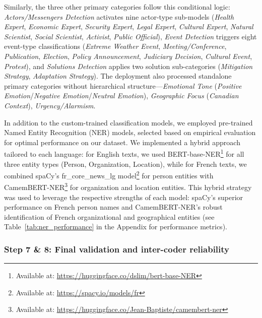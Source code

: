 Similarly, the three other primary categories follow this conditional logic: \emph{Actors/Messengers Detection} activates nine actor-type sub-models (\emph{Health Expert}, \emph{Economic Expert}, \emph{Security Expert}, \emph{Legal Expert}, \emph{Cultural Expert}, \emph{Natural Scientist}, \emph{Social Scientist}, \emph{Activist}, \emph{Public Official}), \emph{Event Detection} triggers eight event-type classifications (\emph{Extreme Weather Event}, \emph{Meeting/Conference}, \emph{Publication}, \emph{Election}, \emph{Policy Announcement}, \emph{Judiciary Decision}, \emph{Cultural Event}, \emph{Protest}), and \emph{Solutions Detection} applies two solution sub-categories (\emph{Mitigation Strategy}, \emph{Adaptation Strategy}). The deployment also processed standalone primary categories without hierarchical structure—\emph{Emotional Tone} (\emph{Positive Emotion}/\emph{Negative Emotion}/\emph{Neutral Emotion}), \emph{Geographic Focus} (\emph{Canadian Context}), \emph{Urgency/Alarmism}. 

In addition to the custom-trained classification models, we employed pre-trained Named Entity Recognition (NER) models, selected based on empirical evaluation for optimal performance on our dataset. We implemented a hybrid approach tailored to each language: for English texts, we used BERT-base-NER\footnote{Available at: \url{https://huggingface.co/dslim/bert-base-NER}} for all three entity types (Person, Organization, Location), while for French texts, we combined spaCy's fr\_core\_news\_lg model\footnote{Available at: \url{https://spacy.io/models/fr}} for person entities with CamemBERT-NER\footnote{Available at: \url{https://huggingface.co/Jean-Baptiste/camembert-ner}} for organization and location entities. This hybrid strategy was used to leverage the respective strengths of each model: spaCy's superior performance on French person names and CamemBERT-NER's robust identification of French organizational and geographical entities (see Table~\ref{tab:ner_performance} in the Appendix for performance metrics).

\subsubsection{Step 7 \& 8: Final validation and inter-coder reliability}


